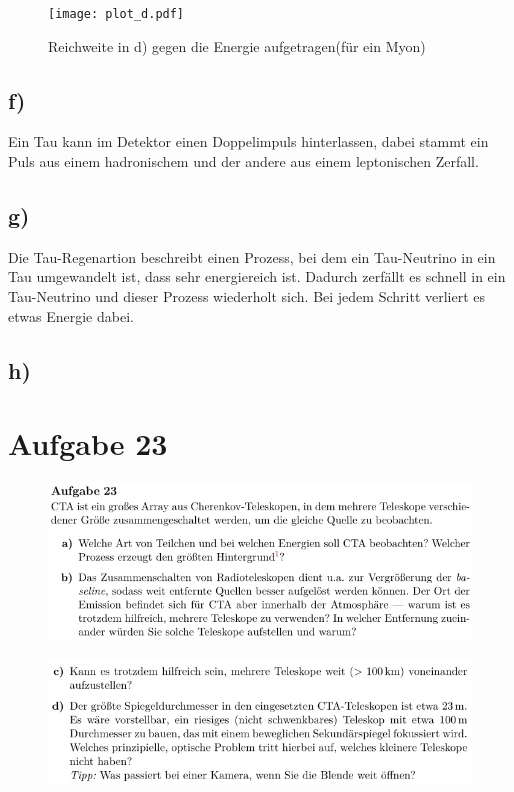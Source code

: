 \begin{figure}[H]
    \centering
    \texttt{[image: plot\_d.pdf]}
    \caption{Reichweite in d) gegen die Energie aufgetragen(für ein Myon)}
\end{figure}


\subsection{f)}
Ein Tau kann im Detektor einen Doppelimpuls hinterlassen, dabei stammt ein Puls
aus einem hadronischem und der andere aus einem leptonischen Zerfall.

\subsection{g)}
Die Tau-Regenartion beschreibt einen Prozess, bei dem ein Tau-Neutrino in ein
Tau umgewandelt ist, dass sehr energiereich ist. Dadurch zerfällt es schnell
in ein Tau-Neutrino und dieser Prozess wiederholt sich. Bei jedem Schritt 
verliert es etwas Energie dabei.

\subsection{h)}


\section{Aufgabe 23}

    \begin{figure}[H]
        \centering
        \includegraphics[width=\textwidth]{images/Aufgabe23a.jpg}
        \label{fig:3}
    \end{figure}

    \begin{figure}[H]
        \centering
        \includegraphics[width=\textwidth]{images/Aufgabe23b.jpg}
        \label{fig:4}
    \end{figure}

